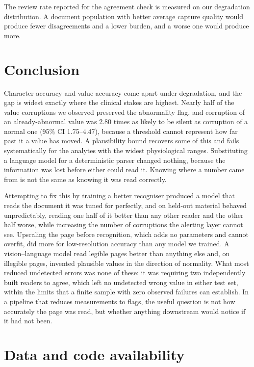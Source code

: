 \documentclass[11pt]{article}
\begin{document}
The review rate reported for the agreement check is measured on our degradation distribution. A
document population with better average capture quality would produce fewer disagreements and a
lower burden, and a worse one would produce more.

\section{Conclusion}

Character accuracy and value accuracy come apart under degradation, and the gap is widest
exactly where the clinical stakes are highest. Nearly half of the value corruptions we observed
preserved the abnormality flag, and corruption of an already-abnormal value was 2.80 times as
likely to be silent as corruption of a normal one (95\% CI 1.75--4.47), because a threshold
cannot represent how far past it a value has moved. A plausibility bound recovers some of this and fails
systematically for the analytes with the widest physiological ranges. Substituting a language
model for a deterministic parser changed nothing, because the information was lost before either
could read it. Knowing where a number came from is not the same as knowing it was read
correctly.

Attempting to fix this by training a better recogniser produced a model that reads the document
it was tuned for perfectly, and on held-out material behaved unpredictably, reading one half of
it better than any other reader and the other half worse, while increasing the number of
corruptions the alerting layer cannot see. Upscaling the page before
recognition, which adds no parameters and cannot overfit, did more for low-resolution accuracy
than any model we trained. A vision--language model read legible pages better than anything else
and, on illegible pages, invented plausible values in the direction of normality. What most reduced undetected errors was none of these: it was requiring two independently built readers to agree, which
left no undetected wrong value in either test set, within the limits that a finite sample with
zero observed failures can establish. In a pipeline that reduces measurements to
flags, the useful question is not how accurately the page was read, but whether anything
downstream would notice if it had not been.

\section*{Data and code availability}
\end{document}
